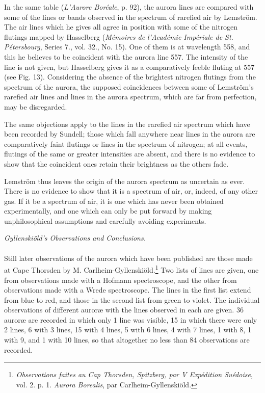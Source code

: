 \documentclass[a4paper, 12pt, oneside, polutonikogreek, english]{article}
\begin{document}
In the same table (\emph{L'Aurore Boréale}, p. 92), the aurora lines are compared with some of the lines or bands observed in the spectrum of rarefied air by Lemström. The air lines which he gives all agree in position with some of the nitrogen flutings mapped by Hasselberg (\emph{Mémoires de l'Académie Impériale de St. Pétersbourg}, Series 7., vol. 32., No. 15). One of them is at wavelength 558, and this he believes to be coincident with the aurora line 557. The intensity of the line is not given, but Hasselberg gives it as a comparatively feeble fluting at 557 (see Fig. 13). Considering the absence of the brightest nitrogen flutings from the spectrum of the aurora, the supposed coincidences between some of Lemström's rarefied air lines and lines in the aurora spectrum, which are far from perfection, may be disregarded.

The same objections apply to the lines in the rarefied air spectrum which have been recorded by Sundell; those which fall anywhere near lines in the aurora are comparatively faint flutings or lines in the spectrum of nitrogen; at all events, flutings of the same or greater intensities are absent, and there is no evidence to show that the coincident ones retain their brightness as the others fade.

Lemström thus leaves the origin of the aurora spectrum as uncertain as ever. There is no evidence to show that it is a spectrum of air, or, indeed, of any other gas. If it be a spectrum of air, it is one which has never been obtained experimentally, and one which can only be put forward by making unphilosophical assumptions and carefully avoiding experiments.
\begin{center}
\emph{Gyllenskiöld's Observations and Conclusions.}
\end{center}
\paragraph{}
Still later observations of the aurora which have been published are those made at Cape Thorsden by M. Carlheim-Gyllenskiöld.\footnote{\emph{Observations faites au Cap Thorsden, Spitzberg, par V Expédition Suédoise}, vol. 2. p. 1. \emph{Aurora Borealis}, par Carlheim-Gyllenskiöld.} Two lists of lines are given, one from observations made with a Hofmann spectroscope, and the other from observations made with a Wrede spectroscope. The lines in the first list extend from blue to red, and those in the second list from green to violet. The individual observations of different auroræ with the lines observed in each are given. 36 auroræ are recorded in which only 1 line was visible, 15 in which there were only 2 lines, 6 with 3 lines, 15 with 4 lines, 5 with 6 lines, 4 with 7 lines, 1 with 8, 1 with 9, and 1 with 10 lines, so that altogether no less than 84 observations are recorded.
\end{document}
